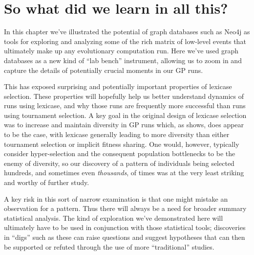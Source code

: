 \section{So what did we learn in all this?}
\label{sec:whatDidWeLearn}

In this chapter we've illustrated the potential of graph databases such as Neo4j as tools for exploring 
and analyzing some of the rich matrix of low-level events that ultimately make up any evolutionary
computation run. Here we've used graph databases as a new kind of ``lab bench'' instrument, allowing us to
zoom in and capture the details of potentially crucial moments in our GP runs.

This has exposed surprising and potentially important properties of lexicase selection. These properties will 
hopefully help us better understand dynamics of runs using lexicase, and why those runs are frequently more 
successful than runs using tournament selection. A key goal in the original design of lexicase selection 
\citep{Helmuth:2015:ieeeTEC} was to increase and maintain diversity in GP runs which, as \citep{Helmuth:2015:GPTP}
shows, does appear to be the case, with lexicase generally leading to more diversity
than either tournament selection or implicit fitness sharing. One would, however, typically consider hyper-selection
and the consequent population bottlenecks to be the enemy of diversity, so our discovery of a pattern of
individuals being selected hundreds, and sometimes even \emph{thousands}, of times was at the very least striking
and worthy of further study.

A key risk in this sort of narrow examination is that one might mistake an observation for a pattern. 
Thus there will always be a need for broader summary statistical analysis. 
The kind of exploration we've demonstrated here will ultimately have
to be used in conjunction with those statistical tools; discoveries in ``digs'' such as these can raise questions 
and suggest hypotheses that can then be supported or refuted through the use of more ``traditional'' studies.

